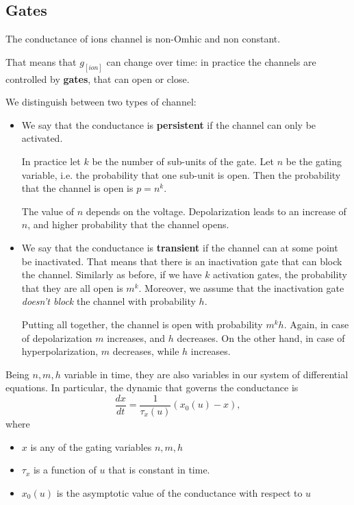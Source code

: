 \documentclass[oneside]{book}
\theoremstyle{definition}
\theoremstyle{plain}
\begin{document}
\subsection{Gates}
The conductance of ions channel is non-Omhic and non constant.

That means that $g_{[ion]}$ can change over time: in practice the channels are controlled by \textbf{gates}, that can open or close.

We distinguish between two types of channel:
\begin{itemize}
    \item We say that the conductance is \textbf{persistent} if the channel can only be activated.
    
    In practice let $k$ be the number of sub-units of the gate. Let $n$ be the gating variable, i.e. the probability that one sub-unit is open. Then the probability that the channel is open is $p=n^k$.

    The value of $n$ depends on the voltage. Depolarization leads to an increase of $n$, and higher probability that the channel opens.
    \item We say that the conductance is \textbf{transient} if the channel can at some point be inactivated. That means that there is an inactivation gate that can block the channel. Similarly as before, if we have $k$ activation gates, the probability that they are all open is $m^k$.
    Moreover, we assume that the inactivation gate \textit{doesn't block} the channel with probability $h$.
    
    Putting all  together, the channel is open with probability $m^k h$.
    Again, in case of depolarization $m$ increases, and $h$ decreases. On the other hand, in case of hyperpolarization, $m$ decreases, while $h$ increases.
\end{itemize}

Being $n, m, h$ variable in time, they are also variables in our system of differential equations. In particular, the dynamic that governs the conductance is
\begin{equation}
    \label{eqn: gating var dynamic}
    \frac{dx}{dt} = \frac{1}{\tau_x(u)} (x_0(u)- x),
\end{equation}
where
\begin{itemize}
    \item $x$ is any of the gating variables $n,m,h$ 
    \item $\tau_x$ is a function of $u$ that is constant in time.
    \item $x_0(u)$ is the asymptotic value of the conductance with respect to $u$
\end{itemize}
\end{document}
